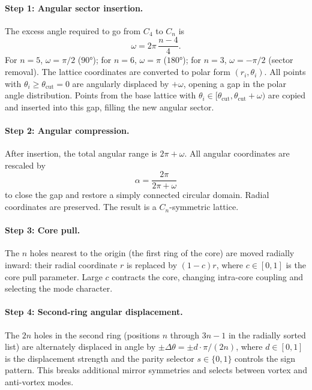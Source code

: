 \documentclass[12pt,a4paper,oneside]{book}
\theoremstyle{plain}
\theoremstyle{definition}
\theoremstyle{remark}
\begin{document}
\paragraph{Step 1: Angular sector insertion.} The excess angle required to go from $C_4$ to $C_n$ is
\begin{equation}
  \omega = 2\pi\,\frac{n-4}{4}.
  \label{eq:volterra-omega}
\end{equation}
For $n = 5$, $\omega = \pi/2$ ($90°$); for $n = 6$, $\omega = \pi$ ($180°$); for $n = 3$, $\omega = -\pi/2$ (sector removal). The lattice coordinates are converted to polar form $(r_i, \theta_i)$. All points with $\theta_i \geq \theta_\mathrm{cut} = 0$ are angularly displaced by $+\omega$, opening a gap in the polar angle distribution. Points from the base lattice with $\theta_i \in [\theta_\mathrm{cut}, \theta_\mathrm{cut} + \omega)$ are copied and inserted into this gap, filling the new angular sector.

\paragraph{Step 2: Angular compression.} After insertion, the total angular range is $2\pi + \omega$. All angular coordinates are rescaled by
\begin{equation}
  \alpha = \frac{2\pi}{2\pi+\omega}
  \label{eq:alpha}
\end{equation}
to close the gap and restore a simply connected circular domain. Radial coordinates are preserved. The result is a $C_n$-symmetric lattice.

\paragraph{Step 3: Core pull.} The $n$ holes nearest to the origin (the first ring of the core) are moved radially inward: their radial coordinate $r$ is replaced by $(1-c)r$, where $c \in [0,1]$ is the core pull parameter. Large $c$ contracts the core, changing intra-core coupling and selecting the mode character.

\paragraph{Step 4: Second-ring angular displacement.} The $2n$ holes in the second ring (positions $n$ through $3n-1$ in the radially sorted list) are alternately displaced in angle by $\pm\Delta\theta = \pm d\cdot\pi/(2n)$, where $d \in [0,1]$ is the displacement strength and the parity selector $s \in \{0,1\}$ controls the sign pattern. This breaks additional mirror symmetries and selects between vortex and anti-vortex modes.
\end{document}
